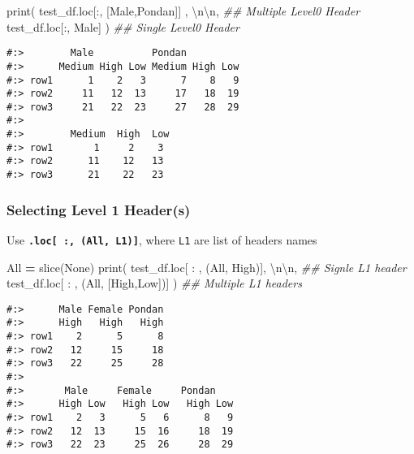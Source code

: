 \documentclass[
]{book}
\newenvironment{Shaded}{\begin{snugshade}}{\end{snugshade}}
\newcommand{\BuiltInTok}[1]{#1}
\newcommand{\CharTok}[1]{\textcolor[rgb]{0.5,0.5,0.5}{#1}}
\newcommand{\CommentTok}[1]{\textcolor[rgb]{0.37,0.37,0.37}{\textit{#1}}}
\newcommand{\NormalTok}[1]{#1}
\newcommand{\OperatorTok}[1]{\textcolor[rgb]{0.43,0.43,0.43}{\textbf{#1}}}
\newcommand{\StringTok}[1]{\textcolor[rgb]{0.5,0.5,0.5}{#1}}
\newcommand{\VariableTok}[1]{\textcolor[rgb]{0,0,0}{#1}}
\begin{document}
\begin{Shaded}
\begin{Highlighting}[]
\BuiltInTok{print}\NormalTok{( test\_df.loc[:, [}\StringTok{\textquotesingle{}Male\textquotesingle{}}\NormalTok{,}\StringTok{\textquotesingle{}Pondan\textquotesingle{}}\NormalTok{]] , }\StringTok{\textquotesingle{}}\CharTok{\textbackslash{}n\textbackslash{}n}\StringTok{\textquotesingle{}}\NormalTok{,  }\CommentTok{\#\# Multiple Level0 Header}
\NormalTok{       test\_df.loc[:, }\StringTok{\textquotesingle{}Male\textquotesingle{}}\NormalTok{] )                     }\CommentTok{\#\# Single Level0 Header}
\end{Highlighting}
\end{Shaded}

\begin{verbatim}
#:>        Male          Pondan         
#:>      Medium High Low Medium High Low
#:> row1      1    2   3      7    8   9
#:> row2     11   12  13     17   18  19
#:> row3     21   22  23     27   28  29 
#:> 
#:>        Medium  High  Low
#:> row1       1     2    3
#:> row2      11    12   13
#:> row3      21    22   23
\end{verbatim}

\hypertarget{selecting-level-1-headers}{%
\subsubsection{Selecting Level 1 Header(s)}\label{selecting-level-1-headers}}

Use \textbf{\texttt{.loc{[}\ :,\ (All,\ L1){]}}}, where \texttt{L1} are list of headers names

\begin{Shaded}
\begin{Highlighting}[]
\NormalTok{All }\OperatorTok{=} \BuiltInTok{slice}\NormalTok{(}\VariableTok{None}\NormalTok{)}
\BuiltInTok{print}\NormalTok{( test\_df.loc[ : , (All, }\StringTok{\textquotesingle{}High\textquotesingle{}}\NormalTok{)],  }\StringTok{\textquotesingle{}}\CharTok{\textbackslash{}n\textbackslash{}n}\StringTok{\textquotesingle{}}\NormalTok{,  }\CommentTok{\#\# Signle L1 header}
\NormalTok{       test\_df.loc[ : , (All, [}\StringTok{\textquotesingle{}High\textquotesingle{}}\NormalTok{,}\StringTok{\textquotesingle{}Low\textquotesingle{}}\NormalTok{])] )  }\CommentTok{\#\# Multiple L1 headers}
\end{Highlighting}
\end{Shaded}

\begin{verbatim}
#:>      Male Female Pondan
#:>      High   High   High
#:> row1    2      5      8
#:> row2   12     15     18
#:> row3   22     25     28 
#:> 
#:>       Male     Female     Pondan    
#:>      High Low   High Low   High Low
#:> row1    2   3      5   6      8   9
#:> row2   12  13     15  16     18  19
#:> row3   22  23     25  26     28  29
\end{verbatim}
\end{document}
